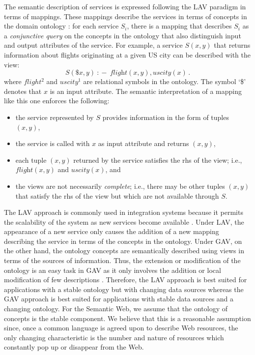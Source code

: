 \documentclass{llncs}
\newcommand{\qrule}{:\!\!-}
\newcommand{\flight}{\textit{flight}}
\newcommand{\UScity}{\textit{uscity}}
\begin{document}
The semantic description of services is expressed following the
LAV paradigm in terms of mappings. These mappings describe the
services in terms of concepts in the domain ontology \cite{Ullman00}:
for each service $S_i$, there is a mapping that describes $S_i$
as a \emph{conjunctive query} on the concepts in the ontology that
also distinguish input and output attributes of the service.
For example, a service $S(x,y)$ that returns information about
flights originating at a given US city can be described with the view:
\[ S(\$x,y)\ \qrule\ \flight(x,y), \UScity(x)\,. \]
where $flight^2$ and $uscity^1$ are relational symbols in the
ontology. The symbol `\$' denotes that $x$ is an input attribute. 
The semantic interpretation of a mapping like this one enforces the following:
\begin{itemize}
\item the service represented by $S$ provides information in the
      form of tuples $(x,y)$,
\item the service is called with $x$ as input attribute and returns $(x,y)$,
\item each tuple $(x,y)$ returned by the service satisfies the rhs
      of the view; i.e., $\flight(x,y)$ and $\UScity(x)$, and
\item the views are not necessarily \emph{complete}; i.e., there may be
      other tuples $(x,y)$ that satisfy the rhs of the view but which
      are not available through $S$.
\end{itemize}

The LAV approach is commonly used in integration systems because it permits
the scalability of the system as new services become available \cite{Ullman00}.
Under LAV, the appearance of a new service only causes the addition of a new
mapping describing the service in terms of the concepts in the ontology.
Under GAV, on the other hand, the ontology concepts are semantically described
using views in terms of the sources of information.
Thus, the extension or modification of the ontology is an easy task in GAV as
it only involves the addition or local modification of few descriptions
\cite{Ullman00}.
Therefore, the LAV approach is best suited for applications with a stable
ontology but with changing data sources whereas the GAV approach is best
suited for applications with stable data sources and a changing ontology.
For the Semantic Web, we assume that the ontology of concepts is the stable
component. We believe that this is a reasonable assumption since, once a
common language is agreed upon to describe Web resources, the only changing
characteristic is the number and nature of resources which constantly pop
up or disappear from the Web.
\end{document}
